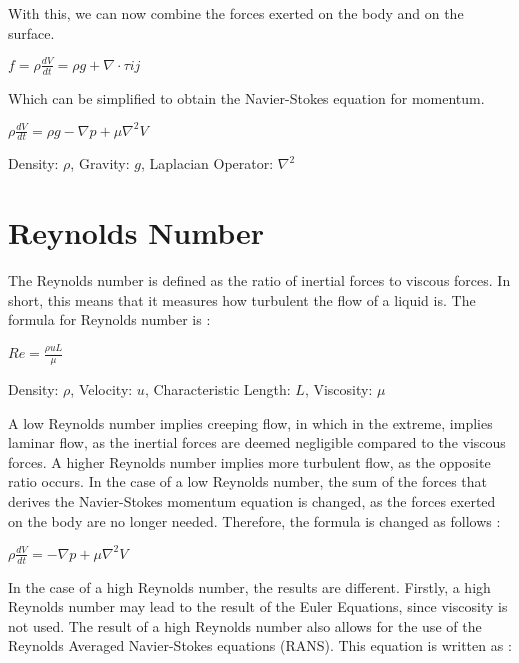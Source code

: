 \documentclass[12pt]{article}
\begin{document}
With this, we can now combine the forces exerted on the body and on the surface.

\begin{center}$ f = \rho \frac{dV}{dt} = \rho g + \nabla \cdot \tau{ij}$
\end{center}

Which can be simplified to obtain the Navier-Stokes equation for momentum.

\begin{center}$ \rho \frac{dV}{dt} = \rho g - \nabla p + \mu \nabla^2 V$
\end{center}
\begin{center}Density: $\rho$, Gravity: $g$, Laplacian Operator: $\nabla^2$
\end{center}

\section{Reynolds Number}
The Reynolds number is defined as the ratio of inertial forces to viscous forces. In short, this means that it measures how turbulent the flow of a liquid is. The formula for Reynolds number is \cite{Navier3}:
\begin{center}$ Re = \frac{\rho u L}{\mu}$\end{center}
\begin{center} Density: $\rho$, Velocity: $u$, Characteristic Length: $L$, Viscosity: $\mu$\end{center}

A low Reynolds number implies creeping flow, in which in the extreme, implies laminar flow, as the inertial forces are deemed negligible compared to the viscous forces. A higher Reynolds number implies more turbulent flow, as the opposite ratio occurs. In the case of a low Reynolds number, the sum of the forces that derives the Navier-Stokes momentum equation is changed, as the forces exerted on the body are no longer needed. Therefore, the formula is changed as follows \cite{Reynolds}:
\begin{center}$ \rho \frac{dV}{dt} = -\nabla p + \mu \nabla^2 V$
\end{center}

In the case of a high Reynolds number, the results are different. Firstly, a high Reynolds number may lead to the result of the Euler Equations, since viscosity is not used. The result of a high Reynolds number also allows for the use of the Reynolds Averaged Navier-Stokes equations (RANS). This equation is written as \cite{RANS}:
\end{document}
